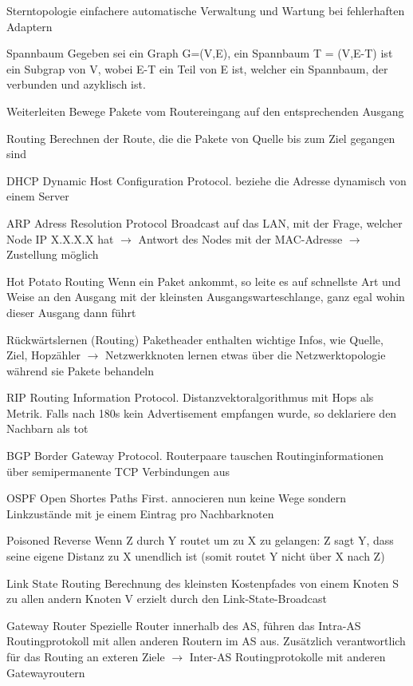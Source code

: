 \documentclass[10pt,landscape]{article}
\begin{document}
\begin{multicols}{3}
\begin{description*}
        \item[Sterntopologie] einfachere automatische Verwaltung und Wartung bei fehlerhaften Adaptern
        \item[Spannbaum] Gegeben sei ein Graph G=(V,E), ein Spannbaum T = (V,E-T) ist ein Subgrap von V, wobei E-T ein Teil von E ist, welcher ein Spannbaum, der verbunden und azyklisch ist.
        \item[Weiterleiten] Bewege Pakete vom Routereingang auf den entsprechenden Ausgang
        \item[Routing] Berechnen der Route, die die Pakete von Quelle bis zum Ziel gegangen sind
        \item[DHCP] Dynamic Host Configuration Protocol. beziehe die Adresse dynamisch von einem Server
        \item[ARP] Adress Resolution Protocol Broadcast auf das LAN, mit der Frage, welcher Node IP X.X.X.X hat $\rightarrow$ Antwort des Nodes mit der MAC-Adresse $\rightarrow$ Zustellung möglich
        \item[Hot Potato Routing] Wenn ein Paket ankommt, so leite es auf schnellste Art und Weise an den Ausgang mit der kleinsten Ausgangswarteschlange, ganz egal wohin dieser Ausgang dann führt
        \item[Rückwärtslernen (Routing)] Paketheader enthalten wichtige Infos, wie Quelle, Ziel, Hopzähler $\rightarrow$ Netzwerkknoten lernen etwas über die Netzwerktopologie während sie Pakete behandeln
        \item[RIP] Routing Information Protocol. Distanzvektoralgorithmus mit Hops als Metrik. Falls nach 180s kein Advertisement empfangen wurde, so deklariere den Nachbarn als tot
        \item[BGP] Border Gateway Protocol. Routerpaare tauschen Routinginformationen über semipermanente TCP Verbindungen aus
        \item[OSPF] Open Shortes Paths First. annocieren nun keine Wege sondern Linkzustände mit je einem Eintrag pro Nachbarknoten
        \item[Poisoned Reverse] Wenn Z durch Y routet um zu X zu gelangen: Z sagt Y, dass seine eigene Distanz zu X unendlich ist (somit routet Y nicht über X nach Z)
        \item[Link State Routing] Berechnung des kleinsten Kostenpfades von einem Knoten S zu allen andern Knoten V erzielt durch den Link-State-Broadcast
        \item[Gateway Router] Spezielle Router innerhalb des AS, führen das Intra-AS Routingprotokoll mit allen anderen Routern im AS aus. Zusätzlich verantwortlich für das Routing an exteren Ziele $\rightarrow$ Inter-AS Routingprotokolle mit anderen Gatewayroutern

\end{description*}
\end{multicols}
\end{document}
